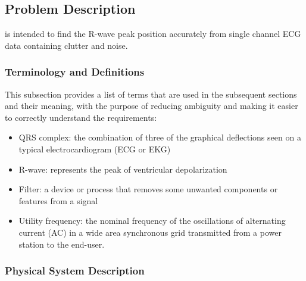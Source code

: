 \documentclass[12pt]{article}
\begin{document}
\subsection{Problem Description} \label{Sec_pd}

\progname{} is intended to find the R-wave peak position accurately from single
channel ECG data containing clutter and noise.


\subsubsection{Terminology and  Definitions}


This subsection provides a list of terms that are used in the subsequent
sections and their meaning, with the purpose of reducing ambiguity and making it
easier to correctly understand the requirements:

\begin{itemize}

\item QRS complex: the combination of three of the graphical deflections seen on
a typical electrocardiogram (ECG or EKG)\cite{wiki:QRS_complex}
\item R-wave: represents the peak of ventricular depolarization
\item Filter: a device or process that removes some unwanted components or
features from a signal\cite{wiki:Filter_(signal_processing)}
\item Utility frequency: the nominal frequency of the oscillations of
alternating current (AC) in a wide area synchronous grid transmitted from a
power station to the end-user.\cite{wiki:Utility_frequency}

\end{itemize}

\subsubsection{Physical System Description} \label{sec_phySystDescrip}
\end{document}
